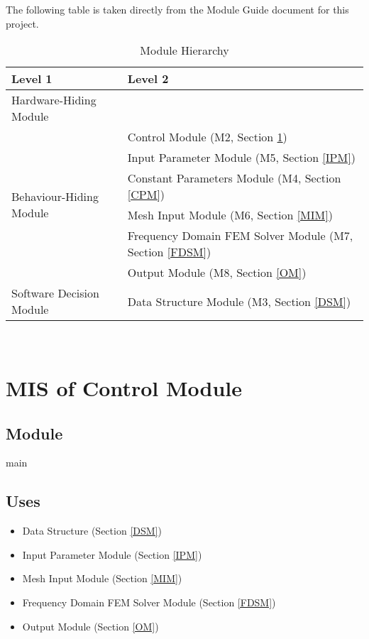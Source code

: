 \documentclass[12pt, titlepage]{article}
\begin{document}
	The following table is taken directly from the Module Guide document for this
	project.
	
	
	\begin{table}[h!] \centering \begin{tabular}{p{} p{}}
			\toprule \textbf{Level 1} & \textbf{Level 2}\\ \midrule
			
			{Hardware-Hiding Module} & ~ \\ \midrule
			
			\multirow{6}{0.3\textwidth}{Behaviour-Hiding Module} & \progname{} Control
			Module (M2, Section \ref{Module})\\ & Input Parameter Module (M5, Section
			\ref{IPM})\\ & Constant Parameters Module (M4, Section \ref{CPM})\\ & Mesh
			Input Module (M6, Section \ref{MIM})\\ & Frequency Domain FEM Solver Module
			(M7, Section \ref{FDSM})\\ & Output Module (M8, Section \ref{OM})\\ \midrule
			
			\multirow{1}{0.3\textwidth}{Software Decision Module} & Data Structure Module
			(M3, Section \ref{DSM})\\ \bottomrule
			
		\end{tabular} \caption{Module Hierarchy} \label{TblMH} \end{table}
	
	
	~\newpage
	
	\section{MIS of \progname{} Control Module} \label{Module}
	
	\subsection{Module} main
	
	\subsection{Uses} \begin{itemize} \item Data Structure (Section \ref{DSM})
		\item Input Parameter Module (Section \ref{IPM}) \item Mesh Input Module
		(Section \ref{MIM}) \item Frequency Domain FEM Solver Module (Section
		\ref{FDSM}) \item Output Module (Section \ref{OM})\\ \end{itemize}
	
\end{document}
